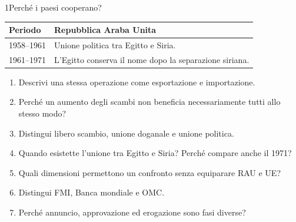 \begin{lettura}{1}{Perché i paesi cooperano?}
\begin{center}\begin{minipage}{\linewidth}\centering\small
\begin{tabularx}{\linewidth}{lX}\toprule
Periodo & Repubblica Araba Unita\\\midrule
1958--1961 & Unione politica tra Egitto e Siria.\\
1961--1971 & L’Egitto conserva il nome dopo la separazione siriana.\\\bottomrule
\end{tabularx}
\end{minipage}\end{center}


\attivita
\begin{enumerate}

\item Descrivi una stessa operazione come esportazione e importazione.

\item Perché un aumento degli scambi non beneficia necessariamente tutti allo stesso modo?

\item Distingui libero scambio, unione doganale e unione politica.

\item Quando esistette l’unione tra Egitto e Siria? Perché compare anche il 1971?

\item Quali dimensioni permettono un confronto senza equiparare RAU e UE?

\item Distingui FMI, Banca mondiale e OMC.

\item Perché annuncio, approvazione ed erogazione sono fasi diverse?

\end{enumerate}
\lessico







\end{lettura}
